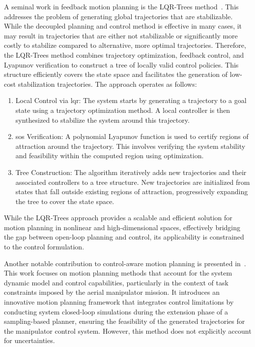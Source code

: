 A seminal work in feedback motion planning is the LQR-Trees method~\cite{cLQRTrees}.
This addresses the problem of generating global trajectories that are stabilizable.
While the decoupled planning and control method is effective in many cases, it may result in trajectories that are either not stabilizable or significantly more costly to stabilize compared to alternative, more optimal trajectories.
Therefore, the LQR-Trees method combines trajectory optimization, feedback control, and Lyapunov verification to construct a tree of locally valid control policies.
This structure efficiently covers the state space and facilitates the generation of low-cost stabilization trajectories.
The approach operates as follows:
\begin{enumerate}
    \item Local Control via \gls{lqr}: The system starts by generating a trajectory to a goal state using a trajectory optimization method. 
    A local  controller is then synthesized to stabilize the system around this trajectory.

    \item \gls{sos} Verification: A polynomial Lyapunov function is used to certify regions of attraction around the trajectory. 
    This involves verifying the system stability and feasibility within the computed region using  optimization.
    
    \item Tree Construction: The algorithm iteratively adds new trajectories and their associated controllers to a tree structure. 
    New trajectories are initialized from states that fall outside existing regions of attraction, progressively expanding the tree to cover the state space.
\end{enumerate}
While the LQR-Trees approach provides a scalable and efficient solution for motion planning in nonlinear and high-dimensional spaces, effectively bridging the gap between open-loop planning and control, its applicability is constrained to the  control formulation.

Another notable contribution to control-aware motion planning is presented in~\cite{cTognon}. 
This work focuses on motion planning methods that account for the system dynamic model and control capabilities, particularly in the context of task constraints imposed by the aerial manipulator mission.
It introduces an innovative motion planning framework that integrates control limitations by conducting system closed-loop simulations during the extension phase of a sampling-based planner, ensuring the feasibility of the generated trajectories for the manipulator control system.
However, this method does not explicitly account for uncertainties.

